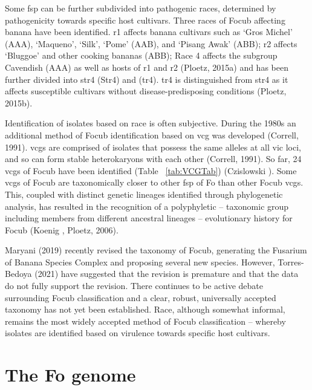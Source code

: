 Some \ac{fsp} can be further subdivided into pathogenic races, determined by pathogenicity towards specific host cultivars. Three races of \ac{Focub} affecting banana have been identified. \acl{r1} affects banana cultivars such as ‘Gros Michel’ (AAA), ‘Maqueno’, ‘Silk’, ‘Pome’ (AAB), and ‘Pisang Awak’ (ABB); \acl{r2} affects ‘Bluggoe’ and other cooking bananas (ABB); Race 4 affects the subgroup Cavendish (AAA) as well as hosts of \ac{r1} and \ac{r2} (Ploetz, 2015a) and has been further divided into \ac{str4} (S\ac{tr4}) and  (\ac{tr4}). \ac{tr4} is distinguished from \ac{str4} as it affects susceptible cultivars without disease-predisposing conditions (Ploetz, 2015b).  

Identification of isolates based on race is often subjective. During the 1980s an additional method of \ac{Focub} identification based on \ac{vcg} was developed (Correll, 1991). \ac{vcg}s are comprised of isolates that possess the same alleles at all \ac{vic} loci, and so can form stable heterokaryons with each other (Correll, 1991). So far, 24 \ac{vcg}s of \ac{Focub} have been identified (Table ~\ref{tab:VCGTab}) (Czislowski ).  Some \ac{vcg}s of \ac{Focub} are taxonomically closer to other \ac{fsp} of \ac{Fo} than other \ac{Focub} \ac{vcg}s. This, coupled with distinct genetic lineages identified through phylogenetic analysis, has resulted in the recognition of a polyphyletic – taxonomic group including members from different ancestral lineages – evolutionary history for \ac{Focub} (Koenig , Ploetz, 2006). 

Maryani \et (2019) recently revised the taxonomy of \ac{Focub}, generating the Fusarium of Banana Species Complex and proposing several new species. However, Torres-Bedoya \et (2021) have suggested that the revision is premature and that the data do not fully support the revision. There continues to be active debate surrounding \ac{Focub} classification and a clear, robust, universally accepted taxonomy has not yet been established. Race, although somewhat informal, remains the most widely accepted method of \ac{Focub} classification – whereby isolates are identified based on virulence towards specific host cultivars.  



\section{The \acl{Fo} genome} 

